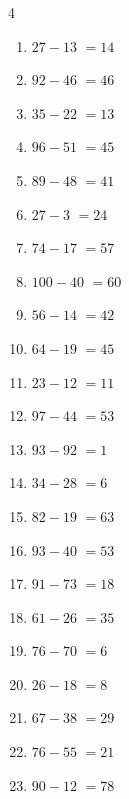 \begin{multicols}{4}
\begin{enumerate}
  \item $27-13$
        $=14$

  \item $92-46$
        $=46$

  \item $35-22$
        $=13$

  \item $96-51$
        $=45$

  \item $89-48$
        $=41$

  \item $27-3$
        $=24$

  \item $74-17$
        $=57$

  \item $100-40$
        $=60$

  \item $56-14$
        $=42$

  \item $64-19$
        $=45$

  \item $23-12$
        $=11$

  \item $97-44$
        $=53$

  \item $93-92$
        $=1$

  \item $34-28$
        $=6$

  \item $82-19$
        $=63$

  \item $93-40$
        $=53$

  \item $91-73$
        $=18$

\columnbreak %

  \item $61-26$
        $=35$

  \item $76-70$
        $=6$

  \item $26-18$
        $=8$

  \item $67-38$
        $=29$

  \item $76-55$
        $=21$

  \item $90-12$
        $=78$


\end{enumerate}
\end{multicols}
